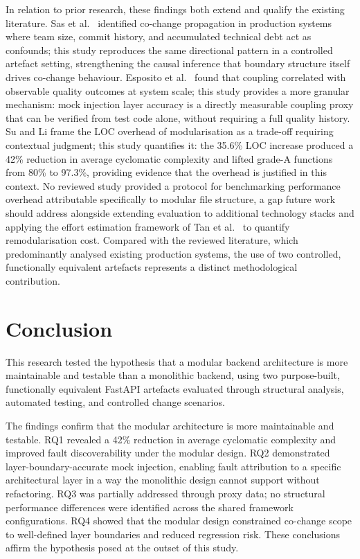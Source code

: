 ﻿\documentclass[conference]{IEEEtran}
\begin{document}
In relation to prior research, these findings both extend and qualify the existing literature. Sas et al.\ \cite{b3} identified co-change propagation in production systems where team size, commit history, and accumulated technical debt act as confounds; this study reproduces the same directional pattern in a controlled artefact setting, strengthening the causal inference that boundary structure itself drives co-change behaviour. Esposito et al.\ \cite{b6} found that coupling correlated with observable quality outcomes at system scale; this study provides a more granular mechanism: mock injection layer accuracy is a directly measurable coupling proxy that can be verified from test code alone, without requiring a full quality history. Su and Li \cite{b5} frame the LOC overhead of modularisation as a trade-off requiring contextual judgment; this study quantifies it: the 35.6\% LOC increase produced a 42\% reduction in average cyclomatic complexity and lifted grade-A functions from 80\% to 97.3\%, providing evidence that the overhead is justified in this context. No reviewed study provided a protocol for benchmarking performance overhead attributable specifically to modular file structure, a gap future work should address alongside extending evaluation to additional technology stacks and applying the effort estimation framework of Tan et al.\ \cite{b2} to quantify remodularisation cost. Compared with the reviewed literature, which predominantly analysed existing production systems, the use of two controlled, functionally equivalent artefacts represents a distinct methodological contribution.

\section{Conclusion}

This research tested the hypothesis that a modular backend architecture is more maintainable and testable than a monolithic backend, using two purpose-built, functionally equivalent FastAPI artefacts evaluated through structural analysis, automated testing, and controlled change scenarios.

The findings confirm that the modular architecture is more maintainable and testable. RQ1 revealed a 42\% reduction in average cyclomatic complexity and improved fault discoverability under the modular design. RQ2 demonstrated layer-boundary-accurate mock injection, enabling fault attribution to a specific architectural layer in a way the monolithic design cannot support without refactoring. RQ3 was partially addressed through proxy data; no structural performance differences were identified across the shared framework configurations. RQ4 showed that the modular design constrained co-change scope to well-defined layer boundaries and reduced regression risk. These conclusions affirm the hypothesis posed at the outset of this study.
\end{document}
